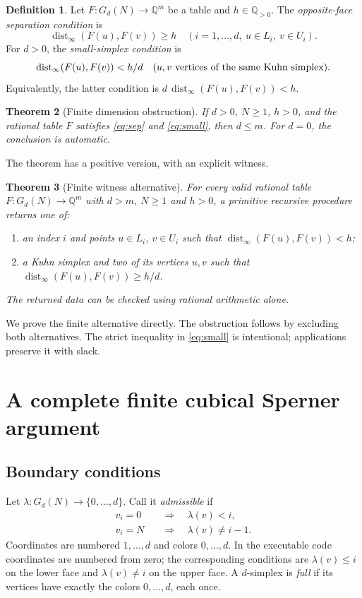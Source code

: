 \documentclass[11pt,a4paper]{article}
\newtheorem{theorem}{Theorem}[section]
\theoremstyle{definition}
\newtheorem{definition}[theorem]{Definition}
\newcommand{\Q}{\mathbb Q}\newcommand{\R}{\mathbb R}
\newcommand{\dist}{\operatorname{dist}_{\infty}}
\begin{document}
\begin{definition}
Let $F:G_d(N)\to\Q^m$ be a table and $h\in\Q_{>0}$.
The \emph{opposite-face separation condition} is
\begin{equation}\label{eq:sep}
 \dist(F(u),F(v))\geq h
 \quad(i=1,\ldots,d,\ u\in L_i,\ v\in U_i).
\end{equation}
For $d>0$, the \emph{small-simplex condition} is
\begin{equation}\label{eq:small}
 \dist(F(u),F(v))<h/d
 \quad(u,v\hbox{ vertices of the same Kuhn simplex}).
\end{equation}
Equivalently, the latter condition is $d\,\dist(F(u),F(v))<h$.
\end{definition}

\begin{theorem}[Finite dimension obstruction]\label{thm:finite}
If $d>0$, $N\geq1$, $h>0$, and the rational table $F$ satisfies
\eqref{eq:sep} and \eqref{eq:small}, then $d\leq m$.
For $d=0$, the conclusion is automatic.
\end{theorem}
The theorem has a positive version, with an explicit witness.
\begin{theorem}[Finite witness alternative]\label{thm:alternative}
For every valid rational table $F:G_d(N)\to\Q^m$ with $d>m$,
$N\geq1$ and $h>0$, a primitive recursive procedure returns one of:
\begin{enumerate}[label=\textup{(\roman*)}]
\item an index $i$ and points $u\in L_i$, $v\in U_i$ such that
      $\dist(F(u),F(v))<h$;
\item a Kuhn simplex and two of its vertices $u,v$ such that
      $\dist(F(u),F(v))\geq h/d$.
\end{enumerate}
The returned data can be checked using rational arithmetic alone.
\end{theorem}
We prove the finite alternative directly. The obstruction follows
by excluding both alternatives. The strict inequality in
\eqref{eq:small} is intentional; applications preserve it with slack.

\section{A complete finite cubical Sperner argument}\label{sec:sperner}
\subsection{Boundary conditions}
Let $\lambda:G_d(N)\to\{0,\ldots,d\}$. Call it \emph{admissible} if
\begin{align}
 v_i=0 &\quad\Longrightarrow\quad \lambda(v)<i,\label{eq:lower}\\
 v_i=N &\quad\Longrightarrow\quad \lambda(v)\ne i-1.\label{eq:upper}
\end{align}
Coordinates are numbered $1,\ldots,d$ and colors $0,\ldots,d$.
In the executable code coordinates are numbered from zero; the
corresponding conditions are $\lambda(v)\leq i$ on the lower face
and $\lambda(v)\ne i$ on the upper face.
A $d$-simplex is \emph{full} if its vertices have exactly the
colors $0,\ldots,d$, each once.
\end{document}
